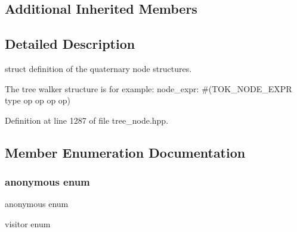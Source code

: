 \subsection*{Additional Inherited Members}


\subsection{Detailed Description}
struct definition of the quaternary node structures. 

The tree walker structure is for example\+: node\+\_\+expr\+: \#(T\+O\+K\+\_\+\+N\+O\+D\+E\+\_\+\+E\+X\+PR type op op op op) 

Definition at line 1287 of file tree\+\_\+node.\+hpp.



\subsection{Member Enumeration Documentation}
\mbox{\label{structquaternary__expr_aae3f44a5bae1c4f51e24df32c3ddb955}} 
\subsubsection{\texorpdfstring{anonymous enum}{anonymous enum}}
{\footnotesize\ttfamily anonymous enum}



visitor enum 

